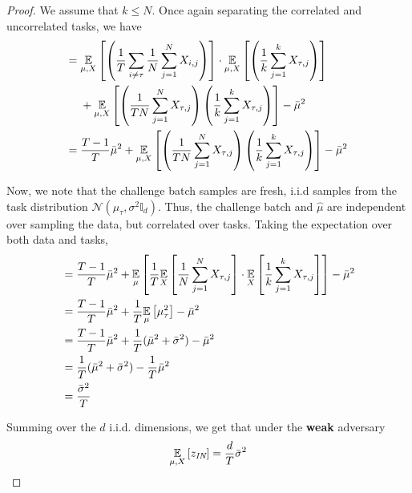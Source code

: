 \begin{proof}
We assume that $k \leq N$. Once again separating the correlated and uncorrelated tasks, we have
\begin{align*}
    ={} &\ex{\mu, X}{ \left( \frac{1}{T} \sum_{i \neq \tau}  \frac{1}{N} \sum_{j=1}^{N} X_{i,j} \right)} \cdot \ex{\mu, X}{\left( \frac{1}{k} \sum_{j=1}^{k} X_{\tau , j} \right) } \\ 
    &+  {\ex{\mu, X}{\left( \frac{1}{TN} \sum_{j=1}^{N} X_{\tau,j} \right) \left( \frac{1}{k} \sum_{j=1}^{k} X_{\tau,j} \right)} } - \mubar^2  \\ 
    ={} &\frac{T-1}{T} \mubar^2 + {\ex{\mu, X}{\left( \frac{1}{TN} \sum_{j=1}^{N} X_{\tau,j} \right) \left( \frac{1}{k} \sum_{j=1}^{k} X_{\tau,j} \right)} } - \mubar^2 
\end{align*}

Now, we note that the challenge batch samples are fresh, i.i.d samples from the task distribution $\mathcal{N}(\mu_\tau , \sigma^{2} \mathbb{I}_d)$. Thus, the challenge batch and $\hat{\mu}$ are independent over sampling the data, but correlated over tasks. Taking the expectation over both data and tasks,
\begin{align*}
    &= \frac{T-1}{T} \mubar^2 + \underset{\mu}{\mathbb{E}} \left[ \frac{1}{T} \underset{X}{\mathbb{E}}  \left[ \frac{1}{N} \sum_{j=1}^{N} X_{\tau,j} \right]  \cdot \underset{X}{\mathbb{E}}  \left[ \frac{1}{k} \sum_{j=1}^{k} X_{\tau,j} \right]  \right]  - \mubar^2  \\
    &= \frac{T-1}{T} \mubar^2 + {\frac{1}{T} \ex{\mu}{\mu_{\tau}^{2}} } - \mubar^2  \\
    &= \frac{T-1}{T} \mubar^2 + {\frac{1}{T} (\mubar^{2} + \bar{\sigma}^2) } - \mubar^2  \\
    &=   \frac{1}{T} (\mubar^{2} + \bar{\sigma}^2) - \frac{1}{T}\mubar^2 \\ 
    &=   \frac{\bar{\sigma}^2}{T} 
\end{align*}

Summing over the $d$ i.i.d. dimensions, we get that under the \textbf{weak} adversary
\[
\ex{\mu, X}{z_{\textit{IN}}} = \frac{d}{T} \bar{\sigma}^{2} 
\]



\end{proof}



